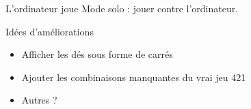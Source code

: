 \begin{UPSTICahierDesCharges}{L'ordinateur joue}
  Mode solo : jouer contre l'ordinateur.
\end{UPSTICahierDesCharges}

\begin{UPSTICahierDesCharges}{Idées d'améliorations} 
  \begin{itemize}
    \item Afficher les dés sous forme de carrés 
    \item Ajouter les combinaisons manquantes du vrai jeu 421
    \item Autres ?
  \end{itemize}
\end{UPSTICahierDesCharges}

